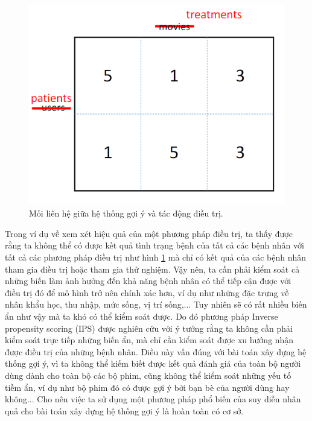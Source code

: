 \begin{figure}[h]
    \centering
    \includegraphics[width=\textwidth]{images/Chapter3/treatment.png}
    \caption{Mối liên hệ giữa hệ thống gợi ý và tác động điều trị.}
    \label{fig:3.0_treatment}
\end{figure}

Trong ví dụ về xem xét hiệu quả của một phương pháp điều trị, ta thấy được rằng ta không thể có được kết quả tình trạng bệnh của tất cả các bệnh nhân với tất cả các phương pháp điều trị như hình \ref{fig:3.0_treatment} mà chỉ có kết quả của các bệnh nhân tham gia điều trị hoặc tham gia thử nghiệm. Vậy nên, ta cần phải kiểm soát cả những biến làm ảnh hưởng đến khả năng bệnh nhân có thể tiếp cận được với điều trị đó để mô hình trở nên chính xác hơn, ví dụ như những đặc trưng về nhân khẩu học, thu nhập, mức sống, vị trí sống,... Tuy nhiên sẽ có rất nhiều biến ẩn như vậy mà ta khó có thể kiểm soát được. Do đó phương pháp Inverse propensity scoring (IPS) được nghiên cứu với ý tưởng rằng ta không cần phải kiểm soát trực tiếp những biến ẩn, mà chỉ cần kiểm soát được xu hướng nhận được điều trị của những bệnh nhân. Điều này vấn đúng với bài toán xây dựng hệ thống gợi ý, vì ta không thể kiếm biết được kết quả đánh giá của toàn bộ người dùng dành cho toàn bộ các bộ phim, cũng không thể kiểm soát những yếu tố tiềm ẩn, ví dụ như bộ phim đó có được gợi ý bởi bạn bè của người dùng hay không... Cho nên việc ta sử dụng một phương pháp phổ biến của suy diễn nhân quả cho bài toán xây dựng hệ thống gợi ý là hoàn toàn có cơ sở.

